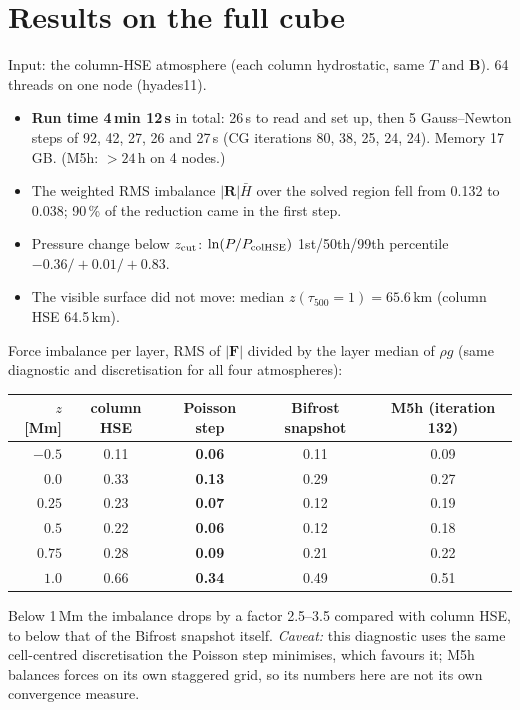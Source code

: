 \documentclass[10pt]{extarticle}
\newcommand{\B}{\mathbf B}\newcommand{\J}{\mathbf J}\newcommand{\F}{\mathbf F}\newcommand{\zh}{\hat{\mathbf z}}
\begin{document}
\section{Results on the full cube}
Input: the column-HSE atmosphere (each column hydrostatic, same $T$ and $\B$). 64 threads on one node (hyades11).
\begin{itemize}
\item \textbf{Run time 4\,min 12\,s} in total: 26\,s to read and set up, then 5 Gauss--Newton steps of 92, 42, 27, 26
and 27\,s (CG iterations 80, 38, 25, 24, 24). Memory 17\,GB. (M5h: $>24$\,h on 4 nodes.)
\item The weighted RMS imbalance $|\mathbf R|\bar H$ over the solved region fell from 0.132 to 0.038; 90\,\% of the
reduction came in the first step.
\item Pressure change below $z_{\rm cut}$: $\ln(P/P_{\rm colHSE})$ 1st/50th/99th percentile $-0.36/+0.01/+0.83$.
\item The visible surface did not move: median $z(\tau_{500}=1)=65.6$\,km (column HSE 64.5\,km).
\end{itemize}

Force imbalance per layer, RMS of $|\F|$ divided by the layer median of $\rho g$ (same diagnostic and discretisation
for all four atmospheres):
\begin{center}
\begin{tabular}{rcccc}
\toprule
$z$ [Mm] & column HSE & \textbf{Poisson step} & Bifrost snapshot & M5h (iteration 132) \\ \midrule
$-0.5$ & 0.11 & \textbf{0.06} & 0.11 & 0.09 \\
$0.0$  & 0.33 & \textbf{0.13} & 0.29 & 0.27 \\
$0.25$ & 0.23 & \textbf{0.07} & 0.12 & 0.19 \\
$0.5$  & 0.22 & \textbf{0.06} & 0.12 & 0.18 \\
$0.75$ & 0.28 & \textbf{0.09} & 0.21 & 0.22 \\
$1.0$  & 0.66 & \textbf{0.34} & 0.49 & 0.51 \\
\bottomrule
\end{tabular}
\end{center}
Below 1\,Mm the imbalance drops by a factor 2.5--3.5 compared with column HSE, to below that of the Bifrost snapshot
itself. \emph{Caveat:} this diagnostic uses the same cell-centred discretisation the Poisson step minimises, which
favours it; M5h balances forces on its own staggered grid, so its numbers here are not its own convergence measure.
\end{document}
